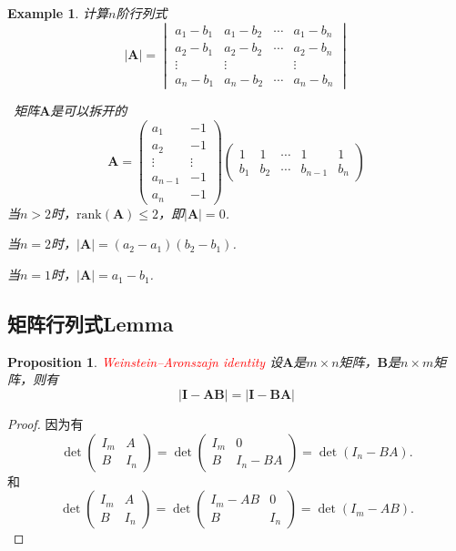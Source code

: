 \documentclass{article}
\newtheorem{proposition}[theorem]{Proposition}
\newtheorem{example}[theorem]{Example}
\newcommand{\hints}{{\color{blue} \text{hints}}}
\newcommand{\mbf}[1]{\bm{#1}}
\newcommand{\rank}[1]{\text{rank}\left(#1\right)} %
\newcommand{\redt}[1]{\textcolor{red}{#1}}
\begin{document}
\begin{example}
\rm 计算$n$阶行列式
$$
|\mbf{A}| = 
\begin{vmatrix}
a_1 - b_1 & a_1 - b_2 & \cdots & a_1 - b_n \\
a_2 - b_1 & a_2 - b_2 & \cdots & a_2 - b_n \\
\vdots & \vdots && \vdots \\
a_n - b_1 & a_n - b_2 & \cdots & a_n - b_n
\end{vmatrix}
$$

\hints\ 矩阵$\mbf{A}$是可以拆开的
$$
\mbf{A} = \begin{pmatrix}
a_1 & -1 \\
a_2 & -1 \\
\vdots & \vdots \\
a_{n-1} & -1 \\
a_n  & -1 
\end{pmatrix} \begin{pmatrix}
1 & 1 & \cdots & 1 & 1\\ 
b_1 & b_2 & \cdots & b_{n-1} & b_n
\end{pmatrix}
$$
当$n > 2$时，$\rank{\mbf{A}} \leq 2$，即$|\mbf{A}| = 0$. 

当$n = 2$时，$|\mbf{A}| = (a_2 - a_1)(b_2 - b_1)$.

当$n = 1$时，$|\mbf{A}| = a_1 - b_1$. 
\end{example}

\subsection{矩阵行列式Lemma}

\begin{proposition}\label{sylvester determinant}
\rm \redt{Weinstein–Aronszajn identity} 设$\mbf{A}$是$m \times n$矩阵，$\mbf{B}$是$n \times m$矩阵，则有
$$
|\mbf{I}-\mbf{A}\mbf{B}| = |\mbf{I}-\mbf{B}\mbf{A}|
$$
\end{proposition}

\begin{proof}
因为有
$$
\det\begin{pmatrix} I_m & A \\ B & I_n \end{pmatrix} 
  = \det\begin{pmatrix} I_m & 0 \\ B & I_n - BA \end{pmatrix} = \det(I_n - BA).
$$
和
$$
\det\begin{pmatrix} I_m & A \\ B & I_n \end{pmatrix} 
  = \det\begin{pmatrix} I_m-AB & 0 \\ B & I_n  \end{pmatrix} = \det(I_m - AB).
$$
\end{proof}
\end{document}

